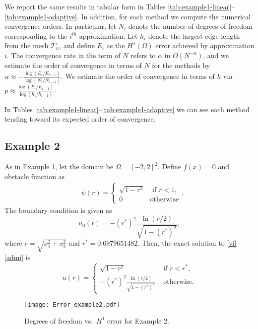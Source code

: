\documentclass[12pt]{article}
\begin{document}
We report the same results in tabular form in Tables \ref{tab:example1-linear}--\ref{tab:example1-adaptive}.  
In addition, for each method we compute the numerical convergence orders.  In particular, let $N_i$ 
denote the number of degrees of freedom corresponding to the $i^{th}$ approximation. Let $h_i$ denote the
largest edge length from the mesh $\mathcal{T}^i_h$, and define $E_i$ as the
$H^1(\Omega)$ error achieved by approximation $i$. The convergence rate in the term of $N$ refers to 
$\alpha$ in $O(N^{-\alpha})$, and we estimate the order of convergence in terms of $N$ for the methods 
by $\alpha\approx -\frac{\log(E_i/E_{i-1})}{\log(N_i/N_{i-1})}$. We estimate the order of
convergence in terms of $h$ via $p\approx\frac{\log(E_i/E_{i-1})}{\log(h_i/h_{i-1})}$.  

In Tables \ref{tab:example1-linear}--\ref{tab:example1-adaptive} we can see
each method tending toward its expected order of convergence. 


\subsection{Example 2}
As in Example 1, let the domain be $\Omega=[-2,2]^2$. Define $f(x)=0$ and obstacle function as
\begin{align*}
  &\psi(r)=\begin{cases}\sqrt{1-r^2}&\text{ if } r<1, \\
                                  0&\text{otherwise}\end{cases}.\label{ex2-f}
\end{align*}
The boundary condition is given as 
\[ u_0(r)=-\left(r^*\right)^2\frac{\ln(r/2)}{\sqrt{1-\left(r^*\right)^2}} \label{ex2-u0}, \]
where $r=\sqrt{x_1^2+x_2^2}$ and $r^*=0.6979651482$.
Then, the exact solution to \eqref{vi}--\eqref{admi} is
\begin{equation*}
u(r)=  \begin{cases}
  \sqrt{1-r^2} &\text{ if } r<r^*,\\
  -\left(r^*\right)^2\frac{\ln(r/2)}{\sqrt{1-\left(r^*\right)^2}} & \text{ otherwise} .
\end{cases}
\end{equation*}


\begin{figure}
\centering
\texttt{[image: Error\_example2.pdf]}
\caption{Degrees of freedom vs.\ $H^1$ error for Example 2.}
\label{fig:example2-error}
\end{figure}
\end{document}
